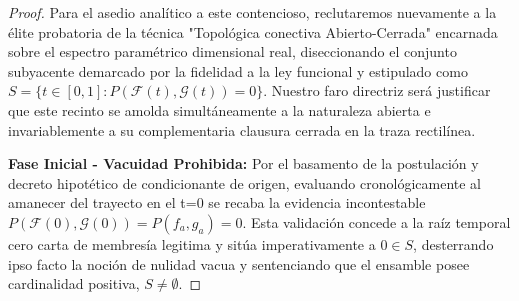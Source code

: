 \documentclass[11pt,a4paper]{article}
\theoremstyle{definition}
\theoremstyle{remark}
\numberwithin{equation}{section}
\begin{document}
\begin{proof}
Para el asedio analítico a este contencioso, reclutaremos nuevamente a la élite probatoria de la técnica "Topológica conectiva Abierto-Cerrada" encarnada sobre el espectro paramétrico dimensional real, diseccionando el conjunto subyacente demarcado por la fidelidad a la ley funcional y estipulado como $S = \{ t \in [0, 1] : P(\mathcal{F}(t), \mathcal{G}(t)) = 0 \}$. Nuestro faro directriz será justificar que este recinto se amolda simultáneamente a la naturaleza abierta e invariablemente a su complementaria clausura cerrada en la traza rectilínea.

\textbf{Fase Inicial - Vacuidad Prohibida:} Por el basamento de la postulación y decreto hipotético de condicionante de origen, evaluando cronológicamente al amanecer del trayecto en el t=0 se recaba la evidencia incontestable $P(\mathcal{F}(0), \mathcal{G}(0)) = P(f_a, g_a) = 0$. Esta validación concede a la raíz temporal cero carta de membresía legitima y sitúa imperativamente a $0 \in S$, desterrando ipso facto la noción de nulidad vacua y sentenciando que el ensamble posee cardinalidad positiva, $S \neq \emptyset$.


\end{proof}
\end{document}
